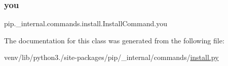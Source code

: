 \mbox{\label{classpip_1_1__internal_1_1commands_1_1install_1_1InstallCommand_a571f93ee83aa3989164ac0002627956d}} 
\subsubsection{\texorpdfstring{you}{you}}
{\footnotesize\ttfamily pip.\+\_\+internal.\+commands.\+install.\+Install\+Command.\+you\hspace{0.3cm}{\ttfamily [static]}}



The documentation for this class was generated from the following file\+:\begin{DoxyCompactItemize}
\item 
venv/lib/python3./site-\/packages/pip/\+\_\+internal/commands/\hyperlink{pip_2__internal_2commands_2install_8py}{install.\+py}\end{DoxyCompactItemize}
